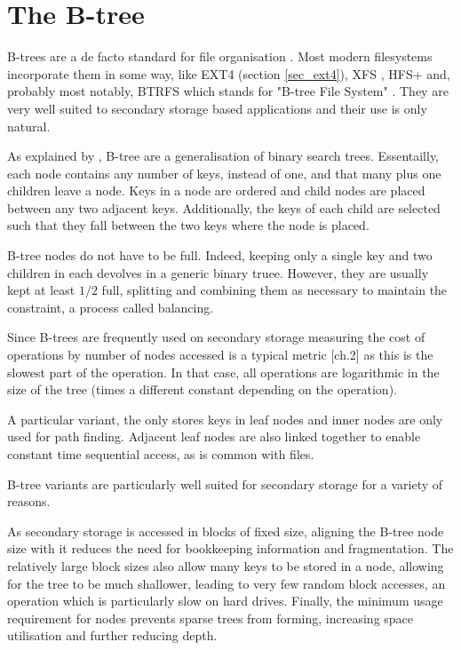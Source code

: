     \section{The B-tree}

        B-trees are a de facto standard for file organisation
        \cite{btree_ubiquitous}. Most modern filesystems incorporate them in
        some way, like EXT4 (section \ref{sec_ext4}), XFS
        \cite{xfs_scalability}, HFS+ \cite{see notes} and, probably most
        notably, BTRFS which stands for "B-tree File System" \cite{the wiki?}.
        They are very well suited to secondary storage based applications and
        their use is only natural.

        As explained by \citeauthor{btree_ubiquitous}, B-tree are a
        generalisation of binary search trees. Essentailly, each node contains
        any number of keys, instead of one, and that many plus one children
        leave a node. Keys in a node are ordered and child nodes are placed
        between any two adjacent keys. Additionally, the keys of each child are
        selected such that they fall between the two keys where the node is
        placed. %

        B-tree nodes do not have to be full. Indeed, keeping only a single key
        and two children in each devolves in a generic binary truee. However,
        they are usually kept at least $1/2$ full, splitting and combining them
        as necessary to maintain the constraint, a process called balancing.

        Since B-trees are frequently used on secondary storage measuring the
        cost of operations by number of nodes accessed is a typical metric
        \cite{btree_ubiquitous}[ch.2] as this is the slowest part of the
        operation. In that case, all operations are logarithmic in the size of
        the tree (times a different constant depending on the operation).

        A particular variant, the \bplustree only stores keys in leaf nodes and
        inner nodes are only used for path finding. Adjacent leaf nodes are
        also linked together to enable constant time sequential access, as is
        common with files.

        B-tree variants are particularly well suited for secondary storage for
        a variety of reasons.

        As secondary storage is accessed in blocks of fixed size, aligning the
        B-tree node size with it reduces the need for bookkeeping information
        and fragmentation. The relatively large block sizes also allow many
        keys to be stored in a node, allowing for the tree to be much
        shallower, leading to very few random block accesses, an operation
        which is particularly slow on hard drives. Finally, the minimum usage
        requirement for nodes prevents sparse trees from forming, increasing
        space utilisation and further reducing depth.

